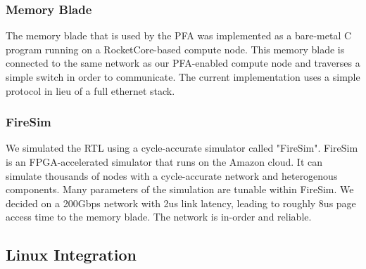 \subsubsection{Memory Blade}
The memory blade that is used by the PFA was implemented as a bare-metal C
program running on a RocketCore-based compute node. This memory blade is
connected to the same network as our PFA-enabled compute node and traverses a
simple switch in order to communicate. The current implementation uses a simple
protocol in lieu of a full ethernet stack. 

\subsubsection{FireSim}
We simulated the RTL using a cycle-accurate simulator called
"FireSim"\cite{firesim}. FireSim is an FPGA-accelerated simulator that runs on
the Amazon cloud. It can simulate thousands of nodes with a cycle-accurate
network and heterogenous components.  Many parameters of the simulation are
tunable within FireSim. We decided on a 200Gbps network with 2us link latency,
leading to roughly 8us page access time to the memory blade. The network is
in-order and reliable. 

\subsection{Linux Integration} \label{sec:linuxImpl}
    
